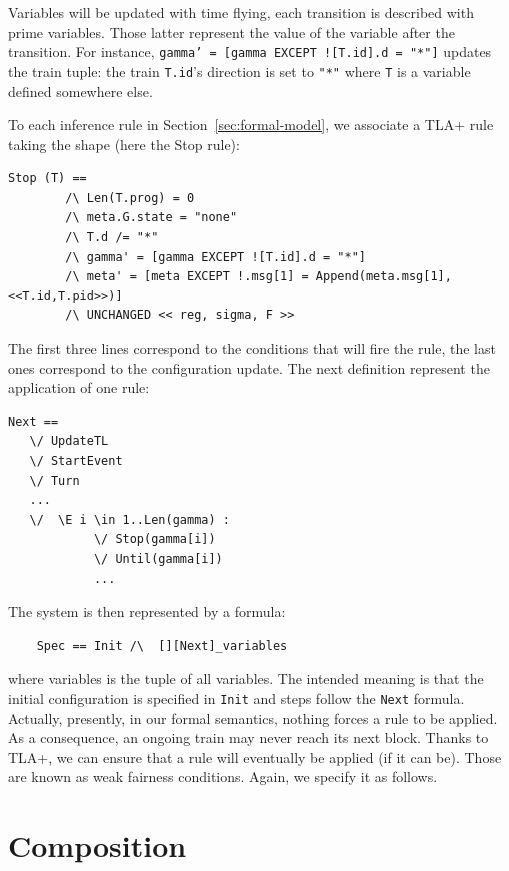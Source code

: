 \documentclass[runningheads]{llncs}
\begin{document}
Variables will be updated with time flying, each transition is described with prime variables. Those latter represent the value of the variable after the transition. For instance, \texttt{gamma' = [gamma EXCEPT ![T.id].d = "*"]} updates the train tuple: the train \texttt{T.id}'s direction is set to \texttt{"*"} where  \texttt{T} is a variable  defined somewhere else. 

To each inference rule in Section~\ref{sec:formal-model}, we associate a TLA+ rule taking the shape (here the Stop rule): 
\begin{verbatim}
Stop (T) ==
        /\ Len(T.prog) = 0
        /\ meta.G.state = "none"
        /\ T.d /= "*"
        /\ gamma' = [gamma EXCEPT ![T.id].d = "*"]
        /\ meta' = [meta EXCEPT !.msg[1] = Append(meta.msg[1],<<T.id,T.pid>>)]
        /\ UNCHANGED << reg, sigma, F >>
 \end{verbatim}
The first three lines correspond to the conditions that will fire the rule, the last ones correspond to the configuration update. The next definition represent the application of one rule:
\begin{verbatim}
Next == 
   \/ UpdateTL
   \/ StartEvent
   \/ Turn
   ...
   \/  \E i \in 1..Len(gamma) :
            \/ Stop(gamma[i])
            \/ Until(gamma[i])
            ...
\end{verbatim}       
        
The system is then represented by a formula:
\begin{verbatim}
    Spec == Init /\  [][Next]_variables
\end{verbatim}%
where variables is the tuple of all variables. The intended meaning is that the initial configuration is specified in \texttt{Init} and steps follow the \texttt{Next} formula.  Actually, presently, in our formal semantics, nothing forces a rule to be applied. As a consequence, an ongoing train may never reach its next block. Thanks to TLA+, we can ensure that a rule will eventually be applied (if it can be). Those are known as weak fairness conditions. Again, we specify it as follows. 


\section{Composition}
\label{sec:composition}
\end{document}
